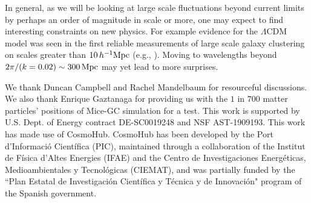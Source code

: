 \documentclass[prd,amsmath,amssymb,floatfix,superscriptaddress,nofootinbib,twocolumn]{revtex4-1}
\begin{document}
In general, as we will be looking at large scale fluctuations beyond current limits by perhaps an order of magnitude in scale or more, one may expect to find interesting constraints on new physics. For example evidence for the $\Lambda$CDM model was seen in the first reliable measurements of large scale galaxy clustering on scales greater than $10\,h^{-1}\rm Mpc$ (e.g., \cite{Efstathio:1990cdm}). Moving to wavelengths beyond $2\pi/(k=0.02) \sim 300 \rm \, Mpc$ may yet lead to more surprises.

\acknowledgements
We thank Duncan Campbell and Rachel Mandelbaum for resourceful discussions. We also thank Enrique Gaztanaga for providing us with the $1$ in $700$ matter particles' positions of Mice-GC simulation for a test. This work is supported by U.S. Dept. of Energy contract DE-SC0019248 and NSF AST-1909193.
This work has made use of CosmoHub. CosmoHub has been developed by the Port d'Informació Científica (PIC), maintained through a collaboration of the Institut de Física d'Altes Energies (IFAE) and the Centro de Investigaciones Energéticas, Medioambientales y Tecnológicas (CIEMAT), and was partially funded by the ``Plan Estatal de Investigación Científica y Técnica y de Innovación" program of the Spanish government.
\clearpage
\end{document}
